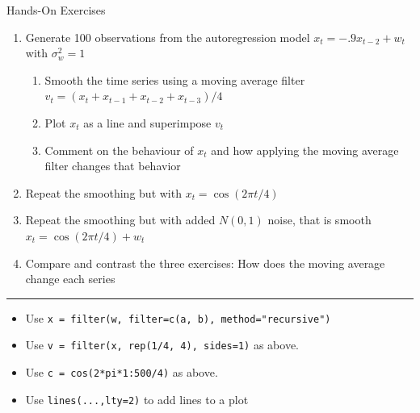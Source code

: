 \documentclass[ignorenonframetext,xcolor=x11names]{beamer}
\begin{document}
\begin{frame}{Hands-On Exercises}
\begin{enumerate}
   \item Generate 100 observations from the autoregression model $x_t = -.9x_{t-2} + w_t$ with $\sigma^2_w = 1$
  \begin{enumerate}
     \item Smooth the time series using a moving average filter $v_t = (x_t + x_{t-1} + x_{t-2} + x_{t-3})/4$
     \item Plot $x_t$ as a line and superimpose $v_t$
     \item Comment on the behaviour of $x_t$ and how applying the moving average filter changes that behavior
  \end{enumerate}
  \item Repeat the smoothing but with $x_t = \cos(2 \pi t / 4)$
  \item Repeat the smoothing but with added $N(0,1)$ noise, that is smooth $x_t = \cos(2\pi t /4) + w_t$
  \item Compare and contrast the three exercises: How does the moving average change each series
\end{enumerate}
\hrule
\footnotesize
\begin{itemize}
  \item Use \texttt{x = filter(w, filter=c(a, b), method="recursive")}
  \item Use \texttt{v = filter(x, rep(1/4, 4), sides=1)} as above.
  \item Use \texttt{c = cos(2*pi*1:500/4)} as above.
  \item Use \texttt{lines(...,lty=2)} to add lines to a plot
\end{itemize}
\end{frame}
\end{document}
